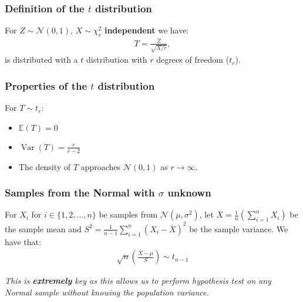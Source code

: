 \documentclass[a4paper, 12pt, twoside]{article}
\DeclareMathOperator{\Var}{Var}
\begin{document}
\subsubsection{Definition of the $t$ distribution}

For $Z \sim \mathcal{N}(0, 1)$, $X \sim \chi^2_r$ \textbf{independent} we have:
\begin{align*}
    T = \frac{Z}{\sqrt{X / r}},
\end{align*}
is distributed with a $t$ distribution with $r$ degrees of freedom ($t_r$).

\subsubsection{Properties of the $t$ distribution}

For $T \sim t_r$:

\begin{itemize}
    \item $\mathbb{E}(T) = 0$
    \item $\Var(T) = \frac{r}{r - 2}$
    \item The density of $T$ approaches $\mathcal{N}(0, 1)$ as $r\to\infty$.
\end{itemize}

\subsubsection{Samples from the Normal with $\sigma$ unknown}

For $X_i$ for $i \in \{1, 2, \ldots, n\}$ be samples from 
$\mathcal{N}(\mu, \sigma^2)$, let $\overline{X} = \frac{1}{n}
(\sum_{i = 1}^n X_i)$ be the sample mean and $S^2 = \frac{1}{n - 1}
\sum_{i = 1}^n(X_i - \overline{X})^2$ be the sample variance. We have that:
\begin{align*}
    \sqrt{n}\left(\frac{\overline{X} - \mu}{S}\right) \sim t_{n - 1}
\end{align*}

\textit{This is \textbf{extremely} key as this allows us to perform hypothesis
test on any Normal sample without knowing the population variance.}
\end{document}
